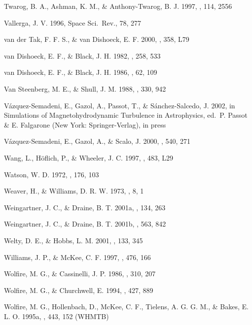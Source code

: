 \documentclass[12pt,preprint,flushrt]{aastex}
\begin{document}
\begin{thebibliography}{}
Twarog, B. A.,
Ashman, K. M., \& Anthony-Twarog, B. J. 1997, \aj, 114, 2556

Vallerga, J. V. 1996, Space Sci.\ Rev.,
78, 277

van der Tak, F. F. S., \&
van Dishoeck, E. F. 2000, \aap, 358, L79

van Dishoeck, E. F., \& Black,
J. H. 1982, \apj, 258, 533

van Dishoeck, E. F., \& Black,
J. H. 1986, \apjs, 62, 109

Van Steenberg, M. E., \&
Shull, J. M. 1988, \apj, 330, 942

V\'azquez-Semadeni,
E., Gazol, A., Passot, T., \& S\'anchez-Salcedo, J. 2002, in Simulations
of Magnetohydrodynamic Turbulence in Astrophysics, ed.\ P. Passot \&
E. Falgarone (New York: Springer-Verlag), in press

V\'azquez-Semadeni,
E., Gazol, A., \& Scalo, J. 2000, \apj, 540, 271

Wang, L., H\"oflich, P., \& Wheeler, J. C. 1997, \apj, 483, L29

Watson, W. D. 1972, \apj, 176, 103

Weaver, H., \& Williams, D. R. W.
1973, \aaps, 8, 1

Weingartner, J. C., \& Draine,
B. T. 2001a, \apjs, 134, 263

Weingartner, J. C., \& Draine,
B. T. 2001b, \apj, 563, 842

Welty, D. E., \& Hobbs, L. M. 2001,
\apjs, 133, 345

Williams, J. P., \& McKee, C. F. 1997,
    \apj, 476, 166

Wolfire, M. G., \& Cassinelli,
J. P. 1986, \apj, 310, 207

Wolfire, M. G., \& Churchwell,
E. 1994, \apj, 427, 889

Wolfire, M. G., Hollenbach, D., McKee, C. F., Tielens,
A. G. G. M., \& Bakes, E. L. O. 1995a, \apj, 443, 152 (WHMTB)


\end{thebibliography}
\end{document}
